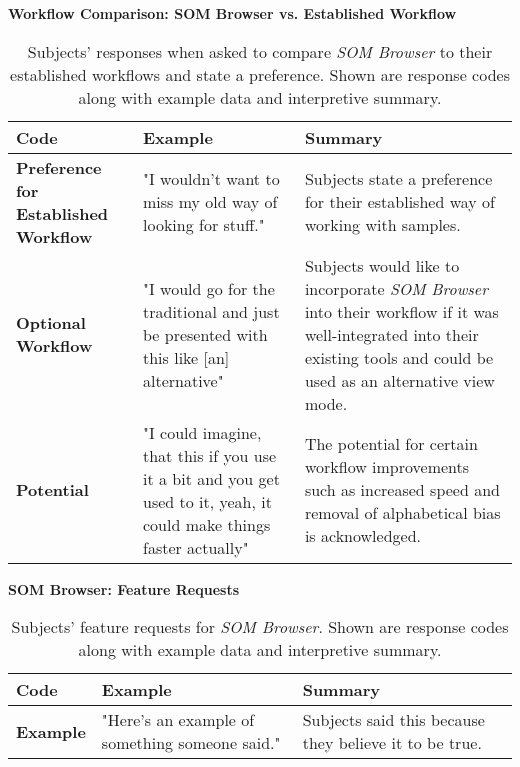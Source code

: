 \begin{table}[!ht]
  \textbf{Workflow Comparison: SOM Browser vs. Established Workflow}
  \renewcommand{\arraystretch}{1.2}
  \centering
  \footnotesize
  \begin{tabular}{ p{4.0cm} p{4.75cm} p{4.75cm} }
  \hline
    \textbf{Code} & \textbf{Example} & \textbf{Summary} \\
    \hline
    \textbf{Preference for Established Workflow}
    &
    "I wouldn't want to miss my old way of looking for stuff."
    &
    Subjects state a preference for their established way of working with
    samples.
    \\
    \textbf{Optional Workflow}
    &
    "I would go for the traditional and just be presented with this like [an]
    alternative"
    &
    Subjects would like to incorporate \textit{SOM Browser} into their workflow
    if it was well-integrated into their existing tools and could be used as an
    alternative view mode.
    \\
    \textbf{Potential}
    &
    "I could imagine, that this if you use it a bit and you get used to it,
    yeah, it could make things faster actually"
    &
    The potential for certain workflow improvements such as increased speed and
    removal of alphabetical bias is acknowledged.
    \\
  \end{tabular}
  \caption[Workflow Comparison \textit{SOM Browser} vs. Established Workflow]
  {Subjects' responses when asked to compare \textit{SOM Browser} to their
  established workflows and state a preference. Shown are response codes along
  with example data and interpretive summary.}
  \label{table:responses_workflow_comparison}
\end{table}

\begin{table}[!ht]
  \textbf{SOM Browser: Feature Requests}
  \renewcommand{\arraystretch}{1.2}
  \centering
  \footnotesize
  \begin{tabular}{ p{4.0cm} p{4.75cm} p{4.75cm} }
  \hline
    \textbf{Code} & \textbf{Example} & \textbf{Summary} \\
    \hline
    \textbf{Example}
    &
    "Here's an example of something someone said."
    &
    Subjects said this because they believe it to be true.
    \\
  \end{tabular}
  \caption[SOM Browser: Feature Requests]{Subjects' feature requests for
  \textit{SOM Browser}. Shown are response codes along with example data and
  interpretive summary.}
  \label{table:responses_feature_requests}
\end{table}

